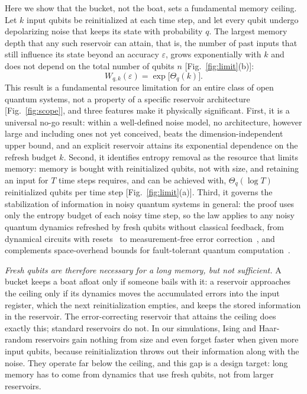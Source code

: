 \documentclass[aps,prl,twocolumn,superscriptaddress,floatfix]{revtex4-2}
\theoremstyle{plain}
\begin{document}
Here we show that the bucket, not the boat, sets a fundamental memory ceiling. Let $k$ input qubits be reinitialized at each time step, and let every qubit undergo depolarizing noise that keeps its state with probability $q$. The largest memory depth that any such reservoir can attain, that is, the number of past inputs that still influence its state beyond an accuracy $\varepsilon$, grows exponentially with $k$ and does not depend on the total number of qubits $n$ [Fig.~\ref{fig:limit}(b)]:
\begin{equation}
W_{q,k}(\varepsilon)=\exp\!\big[\Theta_q(k)\big].
\label{eq:main}
\end{equation}
This result is a fundamental resource limitation for an entire class of open quantum systems, not a property of a specific reservoir architecture [Fig.~\ref{fig:scope}], and three features make it physically significant. First, it is a universal no-go result: within a well-defined noise model, no architecture, however large and including ones not yet conceived, beats the dimension-independent upper bound, and an explicit reservoir attains its exponential dependence on the refresh budget $k$. Second, it identifies entropy removal as the resource that limits memory: memory is bought with reinitialized qubits, not with size, and retaining an input for $T$ time steps requires, and can be achieved with, $\Theta_q(\log T)$ reinitialized qubits per time step [Fig.~\ref{fig:limit}(a)]. Third, it governs the stabilization of information in noisy quantum systems in general: the proof uses only the entropy budget of each noisy time step, so the law applies to any noisy quantum dynamics refreshed by fresh qubits without classical feedback, from dynamical circuits with resets~\cite{Yasuda2023,Hu2024} to measurement-free error correction~\cite{Heussen2024}, and complements space-overhead bounds for fault-tolerant quantum computation~\cite{Fawzi2022}.

\emph{Fresh qubits are therefore necessary for a long memory, but not sufficient.} A bucket keeps a boat afloat only if someone bails with it: a reservoir approaches the ceiling only if its dynamics moves the accumulated errors into the input register, which the next reinitialization empties, and keeps the stored information in the reservoir. The error-correcting reservoir that attains the ceiling does exactly this; standard reservoirs do not. In our simulations, Ising and Haar-random reservoirs gain nothing from size and even forget faster when given more input qubits, because reinitialization throws out their information along with the noise. They operate far below the ceiling, and this gap is a design target: long memory has to come from dynamics that use fresh qubits, not from larger reservoirs.
\end{document}
